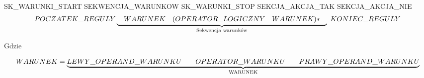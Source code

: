 \documentclass[a4paper,landscape]{article}
\title{}
\author{}
\begin{document}

SK\_WARUNKI\_START SEKWENCJA\_WARUNKOW SK\_WARUNKI\_STOP SEKCJA\_AKCJA\_TAK  SEKCJA\_AKCJA\_NIE
\[POCZATEK\_REGULY
 \underbrace{\hspace*{10pt} WARUNEK \hspace*{10pt}  (OPERATOR\_LOGICZNY \hspace*{10pt} WARUNEK)* \hspace*{10pt}}_\text{Sekwencja warunków} 
\ KONIEC\_REGULY 
\]


Gdzie 

\[
WARUNEK=	\underbrace{LEWY\_OPERAND\_WARUNKU \hspace*{20pt} OPERATOR\_WARUNKU \hspace*{20pt} PRAWY\_OPERAND\_WARUNKU }_\text{WARUNEK}
\]





\end{document}
